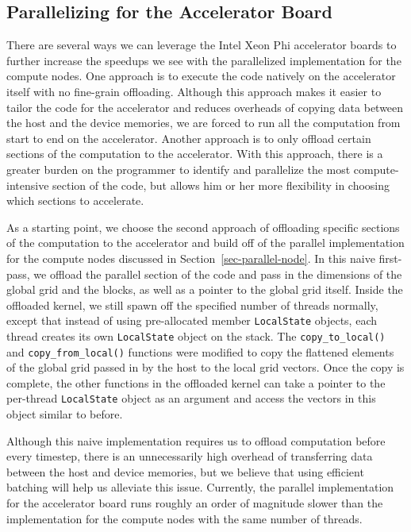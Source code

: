 
\subsection{Parallelizing for the Accelerator Board}
\label{sec-parallel-device}

There are several ways we can leverage the Intel Xeon Phi accelerator
boards to further increase the speedups we see with the parallelized
implementation for the compute nodes. One approach is to execute the code
natively on the accelerator itself with no fine-grain
offloading. Although this approach makes it easier to tailor the code for
the accelerator and reduces overheads of copying data between the host
and the device memories, we are forced to run all the computation from
start to end on the accelerator. Another approach is to only offload
certain sections of the computation to the accelerator. With this
approach, there is a greater burden on the programmer to identify and
parallelize the most compute-intensive section of the code, but allows
him or her more flexibility in choosing which sections to accelerate.

As a starting point, we choose the second approach of offloading specific
sections of the computation to the accelerator and build off of the
parallel implementation for the compute nodes discussed in
Section~\ref{sec-parallel-node}. In this naive first-pass, we offload the
parallel section of the code and pass in the dimensions of the global
grid and the blocks, as well as a pointer to the global grid
itself. Inside the offloaded kernel, we still spawn off the specified
number of threads normally, except that instead of using pre-allocated
member \texttt{LocalState} objects, each thread creates its own \texttt{LocalState} object
on the stack. The \texttt{copy\_to\_local()} and
\texttt{copy\_from\_local()} functions were modified to copy the
flattened elements of the global grid passed in by the host to the local
grid vectors. Once the copy is complete, the other functions in the
offloaded kernel can take a pointer to the per-thread \texttt{LocalState} object
as an argument and access the vectors in this object similar to before.

Although this naive implementation requires us to offload computation
before every timestep, there is an unnecessarily high overhead of
transferring data between the host and device memories, but we believe
that using efficient batching will help us alleviate this
issue. Currently, the parallel implementation for the accelerator board
runs roughly an order of magnitude slower than the implementation for the
compute nodes with the same number of threads.

